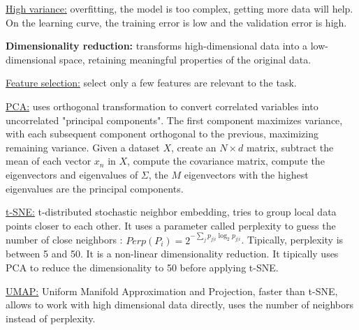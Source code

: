 \underline{High variance:} overfitting, the model is too complex, getting more data will help.
On the learning curve, the training error is low and the validation error is high.

\textbf{Dimensionality reduction:} transforms high-dimensional
data into a low-dimensional space, retaining meaningful properties of the original data.

\underline{Feature selection:} select only a few features are relevant to the task.

\underline{PCA:} uses orthogonal transformation to convert correlated variables into uncorrelated
"principal components". The first component maximizes variance, with each subsequent component
orthogonal to the previous, maximizing remaining variance.
Given a dataset $X$, create an $N\times d$ matrix, subtract the mean of each
vector $x_n$ in $X$, compute the covariance matrix, compute the eigenvectors and eigenvalues of
$\Sigma$, the $M$ eigenvectors with the highest eigenvalues are the principal components.

\underline{t-SNE:} t-distributed stochastic neighbor embedding, tries to group
local data points closer to each other. It uses a parameter called perplexity to
guess the number of close neighbors : $Perp(P_i)=2^{-\sum_{j}p_{j|i}\log_2p_{j|i}}$.
Tipically, perplexity is between 5 and 50. It is a non-linear dimensionality reduction.
It tipically uses PCA to reduce the dimensionality to 50 before applying t-SNE.

\underline{UMAP:} Uniform Manifold Approximation and Projection, faster than t-SNE,
allows to work with high dimensional data directly, uses the number of neighbors
instead of perplexity.